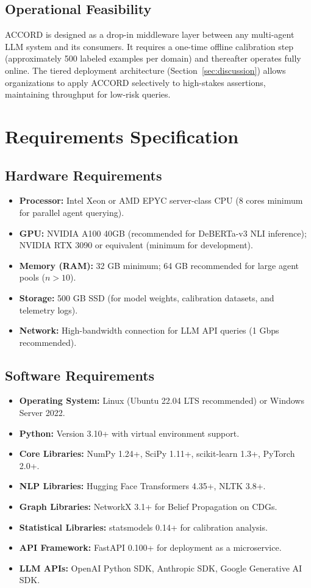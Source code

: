 \documentclass[12pt,a4paper]{report}
\begin{document}
\subsection{Operational Feasibility}
ACCORD is designed as a drop-in middleware layer between any multi-agent LLM system and its consumers. It requires a one-time offline calibration step (approximately 500 labeled examples per domain) and thereafter operates fully online. The tiered deployment architecture (Section~\ref{sec:discussion}) allows organizations to apply ACCORD selectively to high-stakes assertions, maintaining throughput for low-risk queries.

\section{Requirements Specification}

\subsection{Hardware Requirements}
\begin{itemize}
    \item \textbf{Processor:} Intel Xeon or AMD EPYC server-class CPU (8 cores minimum for parallel agent querying).
    \item \textbf{GPU:} NVIDIA A100 40GB (recommended for DeBERTa-v3 NLI inference); NVIDIA RTX 3090 or equivalent (minimum for development).
    \item \textbf{Memory (RAM):} 32 GB minimum; 64 GB recommended for large agent pools ($n > 10$).
    \item \textbf{Storage:} 500 GB SSD (for model weights, calibration datasets, and telemetry logs).
    \item \textbf{Network:} High-bandwidth connection for LLM API queries (1 Gbps recommended).
\end{itemize}

\subsection{Software Requirements}
\begin{itemize}
    \item \textbf{Operating System:} Linux (Ubuntu 22.04 LTS recommended) or Windows Server 2022.
    \item \textbf{Python:} Version 3.10+ with virtual environment support.
    \item \textbf{Core Libraries:} NumPy 1.24+, SciPy 1.11+, scikit-learn 1.3+, PyTorch 2.0+.
    \item \textbf{NLP Libraries:} Hugging Face Transformers 4.35+, NLTK 3.8+.
    \item \textbf{Graph Libraries:} NetworkX 3.1+ for Belief Propagation on CDGs.
    \item \textbf{Statistical Libraries:} statsmodels 0.14+ for calibration analysis.
    \item \textbf{API Framework:} FastAPI 0.100+ for deployment as a microservice.
    \item \textbf{LLM APIs:} OpenAI Python SDK, Anthropic SDK, Google Generative AI SDK.
\end{itemize}
\end{document}

